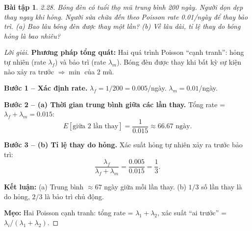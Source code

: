 \documentclass[8pt,a4paper]{article}
\newtheorem{exercise}{Bài tập}
\newenvironment{solution}{\begin{proof}[Lời giải]}{\end{proof}}
\begin{document}
\begin{exercise}
2.28. Bóng đèn có tuổi thọ mũ trung bình 200 ngày. Người dọn dẹp thay ngay khi hỏng. Người sửa chữa đến theo Poisson rate 0.01/ngày để thay bảo trì. 
(a) Bao lâu bóng đèn được thay một lần?
(b) Về lâu dài, tỉ lệ thay do bóng hỏng là bao nhiêu?
\end{exercise}
\begin{solution}
\textbf{Phương pháp tổng quát:} Hai quá trình Poisson ``cạnh tranh'': hỏng tự nhiên (rate $\lambda_f$) và bảo trì (rate $\lambda_m$). Bóng đèn được thay khi bất kỳ sự kiện nào xảy ra trước $\Rightarrow \min$ của 2 mũ.

\textbf{Bước 1 -- Xác định rate.} $\lambda_f = 1/200 = 0.005$/ngày. $\lambda_m = 0.01$/ngày.

\textbf{Bước 2 -- (a) Thời gian trung bình giữa các lần thay.} Tổng rate = $\lambda_f + \lambda_m = 0.015$:
\[
  E[\text{giữa 2 lần thay}] = \frac{1}{0.015} \approx \boxed{66.67 \text{ ngày}}.
\]

\textbf{Bước 3 -- (b) Tỉ lệ thay do hỏng.} Xác suất hỏng tự nhiên xảy ra trước bảo trì:
\[
  \frac{\lambda_f}{\lambda_f + \lambda_m} = \frac{0.005}{0.015} = \boxed{\frac{1}{3}}.
\]

\textbf{Kết luận:} (a) Trung bình $\approx 67$ ngày giữa mỗi lần thay. (b) $1/3$ số lần thay là do hỏng, $2/3$ là bảo trì chủ động.

\textbf{Mẹo:} Hai Poisson cạnh tranh: tổng rate = $\lambda_1 + \lambda_2$, xác suất ``ai trước'' = $\lambda_i/(\lambda_1+\lambda_2)$.
\end{solution}
\end{document}
